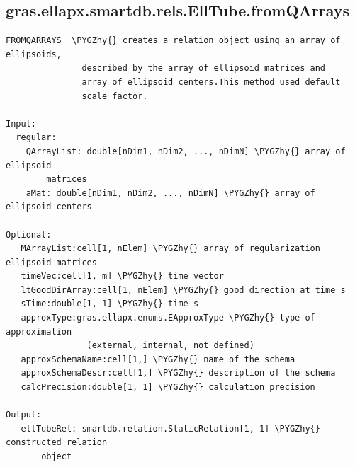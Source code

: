 \documentclass[letterpaper,10pt,english]{sphinxmanual}
\def\PYGZhy{\char`\-}
\begin{document}
\subsection{gras.ellapx.smartdb.rels.EllTube.fromQArrays}
\label{chap_functions:gras-ellapx-smartdb-rels-elltube-fromqarrays}
\begin{Verbatim}[commandchars=\\\{\}]
FROMQARRAYS  \PYGZhy{} creates a relation object using an array of ellipsoids,
               described by the array of ellipsoid matrices and
               array of ellipsoid centers.This method used default
               scale factor.

Input:
  regular:
    QArrayList: double[nDim1, nDim2, ..., nDimN] \PYGZhy{} array of ellipsoid
        matrices
    aMat: double[nDim1, nDim2, ..., nDimN] \PYGZhy{} array of ellipsoid centers

Optional:
   MArrayList:cell[1, nElem] \PYGZhy{} array of regularization ellipsoid matrices
   timeVec:cell[1, m] \PYGZhy{} time vector
   ltGoodDirArray:cell[1, nElem] \PYGZhy{} good direction at time s
   sTime:double[1, 1] \PYGZhy{} time s
   approxType:gras.ellapx.enums.EApproxType \PYGZhy{} type of approximation
                (external, internal, not defined)
   approxSchemaName:cell[1,] \PYGZhy{} name of the schema
   approxSchemaDescr:cell[1,] \PYGZhy{} description of the schema
   calcPrecision:double[1, 1] \PYGZhy{} calculation precision

Output:
   ellTubeRel: smartdb.relation.StaticRelation[1, 1] \PYGZhy{} constructed relation
       object
\end{Verbatim}
\end{document}
